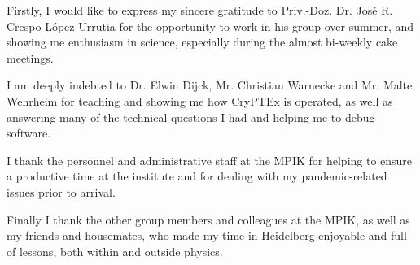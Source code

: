 \acknowledgements \label{acknowledgements} %
\vspace{-5mm}
Firstly, I would like to express my sincere gratitude to Priv.-Doz. Dr. José R. Crespo López-Urrutia for the opportunity to work in his group over summer, and showing me enthusiasm in science, especially during the almost bi-weekly cake meetings.

\noindent I am deeply indebted to Dr. Elwin Dijck, Mr. Christian Warnecke and Mr. Malte Wehrheim for teaching and showing me how CryPTEx is operated, as well as answering many of the technical questions I had and helping me to debug software. 

\noindent I thank the personnel and administrative staff at the MPIK for helping to ensure a productive time at the institute and for dealing with my pandemic-related issues prior to arrival. 

\noindent Finally I thank the other group members and colleagues at the MPIK, as well as my friends and housemates, who made my time in Heidelberg enjoyable and full of lessons, both within and outside physics. 

\noindent \textbf{\Submitdate} \hspace{7cm} \textbf{\Author} %




